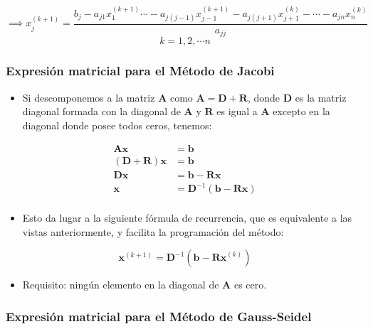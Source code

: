 \documentclass[]{book}
\providecommand{\tightlist}{%
  \setlength{\itemsep}{0pt}\setlength{\parskip}{0pt}}
\begin{document}
\[
\implies
x_j^{(k+1)} = \frac{b_j - a_{j1}x_1^{(k+1)} \cdots - a_{j(j-1)}x_{j-1}^{(k+1)} - a_{j(j+1)}x_{j+1}^{(k)} - \cdots - a_{jn}x_n^{(k)}}{ a_{jj}}
\]
\[
k=1, 2, \cdots n
\]

\hypertarget{expresiuxf3n-matricial-para-el-muxe9todo-de-jacobi}{%
\subsubsection{Expresión matricial para el Método de Jacobi}\label{expresiuxf3n-matricial-para-el-muxe9todo-de-jacobi}}

\begin{itemize}
\tightlist
\item
  Si descomponemos a la matriz \(\mathbf{A}\) como \(\mathbf{A=D+R}\), donde \(\mathbf{D}\) es la matriz diagonal formada con la diagonal de \(\mathbf{A}\) y \(\mathbf{R}\) es igual a \(\mathbf{A}\) excepto en la diagonal donde posee todos ceros, tenemos:
\end{itemize}

\begin{align*} 
\mathbf{Ax} &= \mathbf{b} \\
\mathbf{(D+R)x} &= \mathbf{b} \\
\mathbf{Dx} &= \mathbf{b} - \mathbf{Rx}  \\
\mathbf{x} &= \mathbf{D}^{-1} (\mathbf{b} - \mathbf{Rx})  \\
\end{align*}

\begin{itemize}
\tightlist
\item
  Esto da lugar a la siguiente fórmula de recurrencia, que es equivalente a las vistas anteriormente, y facilita la programación del método:
\end{itemize}

\[
\mathbf{x}^{(k+1)} = \mathbf{D}^{-1} (\mathbf{b} - \mathbf{Rx}^{(k)}) 
\]

\begin{itemize}
\tightlist
\item
  Requisito: ningún elemento en la diagonal de \(\mathbf{A}\) es cero.
\end{itemize}

\hypertarget{expresiuxf3n-matricial-para-el-muxe9todo-de-gauss-seidel}{%
\subsubsection{Expresión matricial para el Método de Gauss-Seidel}\label{expresiuxf3n-matricial-para-el-muxe9todo-de-gauss-seidel}}
\end{document}
